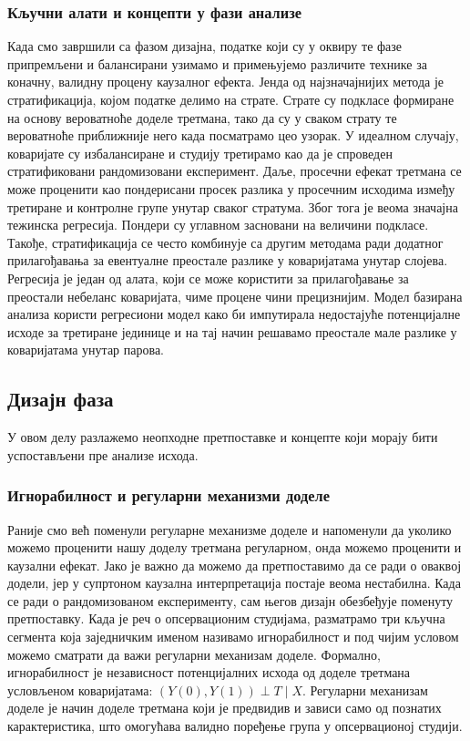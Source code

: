 \documentclass[12pt, a4paper]{article}
\begin{document}
\subsubsection{Кључни алати и концепти у фази анализе}
Када смо завршили са фазом дизајна, податке који су у оквиру те фазе припремљени и балансирани узимамо и примењујемо различите технике за коначну, валидну процену каузалног ефекта. Јенда од најзначајнијих метода је стратификација, којом податке делимо на страте. Страте су подкласе формиране на основу вероватноће доделе третмана, тако да су у сваком страту те вероватноће приближније него када посматрамо цео узорак. У идеалном случају, коваријате су избалансиране и студију  третирамо као да је спроведен стратификовани рандомизовани експеримент. Даље, просечни ефекат третмана се може проценити као пондерисани просек разлика у просечним исходима између третиране и контролне групе унутар сваког стратума. Због тога је веома значајна тежинска регресија. Пондери су углавном засновани на величини подкласе. Такође, стратификација се често комбинује са другим методама ради додатног прилагођавања за евентуалне преостале разлике у коваријатама унутар слојева. Регресија је један од алата, који се може користити за прилагођавање за преостали небеланс коваријата, чиме процене чини прецизнијим. Модел базирана анализа користи регресиони модел како би импутирала недостајуће потенцијалне исходе за третиране јединице и на тај начин решавамо преостале мале разлике у коваријатама унутар парова.
\subsection{Дизајн фаза}
У овом делу разлажемо неопходне претпоставке и концепте који морају бити успостављени пре анализе исхода. 
\subsubsection{Игнорабилност и регуларни механизми доделе}
Раније смо већ поменули регуларне механизме доделе и напоменули да уколико можемо проценити нашу доделу третмана регуларном, онда можемо проценити и каузални ефекат. Јако је важно да можемо да претпоставимо да се ради о оваквој додели, јер у супртоном каузална интерпретација постаје веома нестабилна. Када се ради о рандомизованом експерименту, сам његов дизајн обезбеђује поменуту претпоставку. Када је реч о опсервационим студијама, разматрамо три кључна сегмента која заједничким именом називамо игнорабилност и под чијим условом можемо сматрати да важи регуларни механизам доделе. 
Формално, игнорабилност је независност потенцијалних исхода од доделе третмана условљеном коваријатама: $(Y(0), Y(1)) \perp T \mid X$. Регуларни механизам доделе је начин доделе третмана који је предвидив и зависи само од познатих карактеристика, што омогућава валидно поређење група у опсервационој студији.
\end{document}
